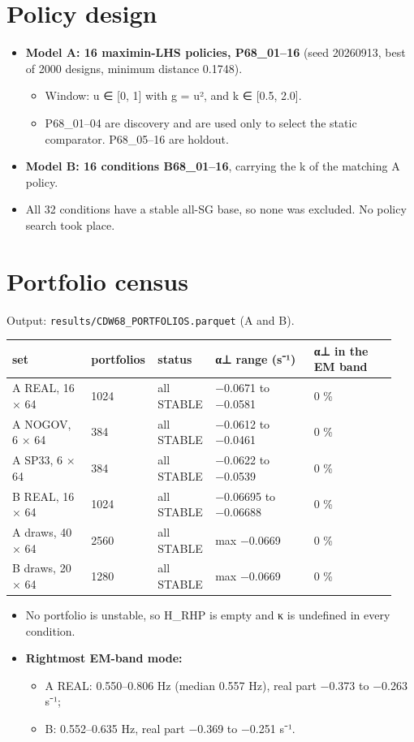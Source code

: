 \documentclass[10pt,a4paper]{article}
\begin{document}
\section{Policy design}
\begin{itemize}
\item \textbf{Model A: 16 maximin-LHS policies, P68\_01–16} (seed 20260913, best of 2000 designs, minimum distance 0.1748).
\begin{itemize}
\item Window: u ∈ [0, 1] with g = u², and k ∈ [0.5, 2.0].
\item P68\_01–04 are discovery and are used only to select the static comparator. P68\_05–16 are holdout.
\end{itemize}
\item \textbf{Model B: 16 conditions B68\_01–16}, carrying the k of the matching A policy.
\item All 32 conditions have a stable all-SG base, so none was excluded. No policy search took place.
\end{itemize}
\section{Portfolio census}
Output: \texttt{results/\allowbreak{}CDW68\_\allowbreak{}PORTFOLIOS.parquet} (A and B).

{\small
\begin{longtable}{L{0.206\linewidth}L{0.129\linewidth}L{0.129\linewidth}L{0.258\linewidth}L{0.219\linewidth}}
\toprule
\textbf{set} & \textbf{portfolios} & \textbf{status} & \textbf{α⊥ range (s⁻¹)} & \textbf{α⊥ in the EM band} \\
\midrule
\endhead
A REAL, 16 × 64 & 1024 & all STABLE & −0.0671 to −0.0581 & 0 \% \\
A NOGOV, 6 × 64 & 384 & all STABLE & −0.0612 to −0.0461 & 0 \% \\
A SP33, 6 × 64 & 384 & all STABLE & −0.0622 to −0.0539 & 0 \% \\
B REAL, 16 × 64 & 1024 & all STABLE & −0.06695 to −0.06688 & 0 \% \\
A draws, 40 × 64 & 2560 & all STABLE & max −0.0669 & 0 \% \\
B draws, 20 × 64 & 1280 & all STABLE & max −0.0669 & 0 \% \\
\bottomrule
\end{longtable}}
\begin{itemize}
\item No portfolio is unstable, so H\_RHP is empty and κ is undefined in every condition.
\item \textbf{Rightmost EM-band mode:}
\begin{itemize}
\item A REAL: 0.550–0.806 Hz (median 0.557 Hz), real part −0.373 to −0.263 s⁻¹;
\item B: 0.552–0.635 Hz, real part −0.369 to −0.251 s⁻¹.
\end{itemize}
\end{itemize}
\end{document}
